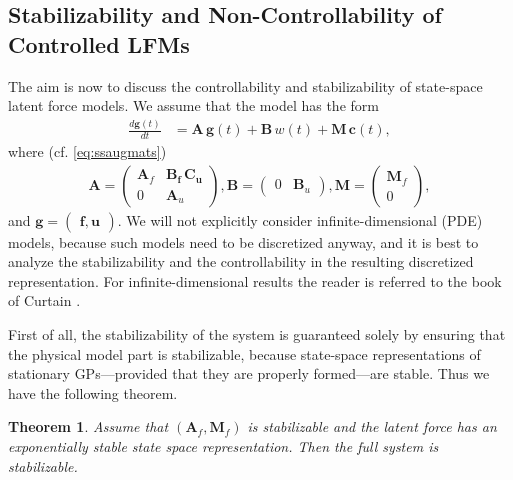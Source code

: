 \documentclass[journal]{IEEEtran}
\newtheorem{theorem}{Theorem}[section]
\begin{document}
\subsection{Stabilizability and Non-Controllability of Controlled LFMs}
%
The aim is now to discuss the controllability and stabilizability of state-space latent force models. We assume that the model has the form
%
\begin{equation}
\begin{split}
  \frac{d\mathbf{g}(t)}{dt}
  &= \mathbf{A} \, \mathbf{g}(t)
  + \mathbf{B} \, w(t) + \mathbf{M} \, \mathbf{c}(t),
\end{split}
\end{equation}
%
where (cf. \eqref{eq:ssaugmats})
%
\begin{equation}
\begin{split}
  \mathbf{A}
  = \begin{pmatrix}
	\mathbf{A}_f & \mathbf{\mathbf{B}_f \, \mathbf{C}_u} \\
	0 & \mathbf{A}_u
  \end{pmatrix}, 
  \mathbf{B}
  = \begin{pmatrix}
	0 & \mathbf{B}_u
  \end{pmatrix}, 
  \mathbf{M} = \begin{pmatrix} \mathbf{M}_f \\ 0 \end{pmatrix},
\end{split}
\end{equation}
%
and $\mathbf{g} = \begin{pmatrix} \mathbf{f}, \mathbf{u} \end{pmatrix}$. We will not explicitly consider infinite-dimensional (PDE) models, because such models need to be discretized anyway, and it is best to analyze the stabilizability and the controllability in the resulting discretized representation. For infinite-dimensional results the reader is referred to the book of Curtain \cite{Curtain:2012}.

First of all, the stabilizability of the system is guaranteed solely by ensuring that the physical model part is stabilizable, because state-space representations of stationary GPs---provided that they are properly formed---are stable. Thus we have the following theorem.

\begin{theorem} \label{the:stab}
Assume that $(\mathbf{A}_f,\mathbf{M}_f)$ is stabilizable and the latent force has an exponentially stable state space representation. Then the full system is \emph{stabilizable}.
\end{theorem}
\end{document}
